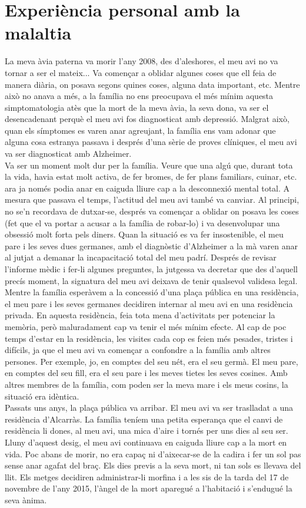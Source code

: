 \documentclass[a4paper,12pt]{report}
\begin{document}
\section*{Experiència personal amb la malaltia}
La meva àvia paterna va morir l'any 2008, des d'aleshores, el meu avi no va tornar a ser el mateix... Va començar a oblidar algunes coses que ell feia de manera diària, on posava segons quines coses, alguna data important, etc. Mentre això no anava a més, a la família no ens preocupava el més mínim aquesta simptomatologia atès que la mort de la meva àvia, la seva dona, va ser el desencadenant perquè el meu avi fos diagnosticat amb depressió. Malgrat això, quan els símptomes es varen anar agreujant, la família ens vam adonar que alguna cosa estranya passava i després d'una sèrie de proves clíniques, el meu avi va ser diagnosticat amb Alzheimer.\\
Va ser un moment molt dur per la família. Veure que una algú que, durant tota la vida, havia estat molt activa, de fer bromes, de fer plans familiars, cuinar, etc. ara ja només podia anar en caiguda lliure cap a la desconnexió mental total. A mesura que passava el temps, l'actitud del meu avi també va canviar. Al principi, no se'n recordava de dutxar-se, després va començar a oblidar on posava les coses (fet que el va portar a acusar a la família de robar-lo) i va desenvolupar una obsessió molt forta pels diners. Quan la situació es va fer insostenible, el meu pare i les seves dues germanes, amb el diagnòstic d'Alzheimer a la mà varen anar al jutjat a demanar la incapacitació total del meu padrí. Després de revisar l'informe mèdic i fer-li algunes preguntes, la jutgessa va decretar que des d'aquell precís moment, la signatura del meu avi deixava de tenir qualsevol validesa legal.\\
Mentre la família esperàvem a la concessió d'una plaça pública en una residència, el meu pare i les seves germanes decidiren internar al meu avi en una residència privada. En aquesta residència, feia tota mena d'activitats per potenciar la memòria, però maluradament cap va tenir el més mínim efecte. Al cap de poc temps d'estar en la residència, les visites cada cop es feien més pesades, tristes i difícils, ja que el meu avi va començar a confondre a la família amb altres persones. Per exemple, jo, en comptes del seu nét, era el seu germà. El meu pare, en comptes del seu fill, era el seu pare i les meves tietes les seves cosines. Amb altres membres de la família, com poden ser la meva mare i els meus cosins, la situació era idèntica.\\
Passats uns anys, la plaça pública va arribar. El meu avi va ser traslladat a una residència d'Alcarràs. La família teníem una petita esperança que el canvi de residència li dones, al meu avi, una mica d'aire i tornés per uns dies al seu ser. Lluny d'aquest desig, el meu avi continuava en caiguda lliure cap a la mort en vida. Poc abans de morir, no era capaç ni d'aixecar-se de la cadira i fer un sol pas sense anar agafat del braç. Els dies previs a la seva mort, ni tan sols es llevava del llit. Els metges decidiren administrar-li morfina i a les sis de la tarda del 17 de novembre de l'any 2015, l'àngel de la mort aparegué a l'habitació i s'endugué la seva ànima.
\end{document}
